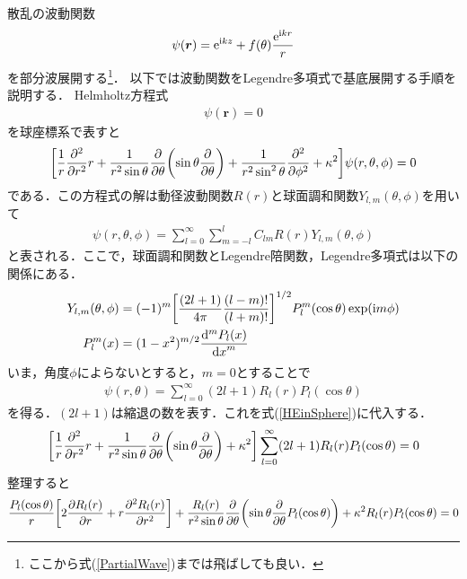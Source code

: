 \documentclass{report}
\begin{document}
  散乱の波動関数
  \begin{align}
    \psi(\bm{r}) = \mathrm{e}^{\mathrm{i} kz} + f(\theta)\frac{\mathrm{e}^{\mathrm{i} kr}}{r}
  \end{align}
  を部分波展開する\footnote{ここから式(\ref{PartialWave})までは飛ばしても良い．}．
  以下では波動関数をLegendre多項式で基底展開する手順を説明する．
  Helmholtz方程式
  \begin{align}
    [\nabla^2 + \kappa^2]\psi(\bm{r}) = 0
  \end{align}
  を球座標系で表すと
  \begin{align}
    \label{HEinSphere}
    \qty[\frac{1}{r}\frac{\partial^2}{\partial r^2}r + \frac{1}{r^2 \sin \theta} \frac{\partial}{\partial \theta}\qty(\sin\theta\frac{\partial}{\partial \theta})
    + \frac{1}{r^2 \sin^2\theta}\frac{\partial^2}{\partial \phi^2} + \kappa^2]\psi(r,\theta,\phi) = 0
  \end{align}
  である．この方程式の解は動径波動関数$R(r)$と球面調和関数$Y_{l,m}(\theta, \phi)$を用いて
  \begin{align}
    \psi(r,\theta,\phi) = \sum_{l=0}^{\infty}\sum_{m=-l}^{l}C_{lm}R(r)Y_{l,m}(\theta,\phi)
  \end{align}
  と表される．ここで，球面調和関数とLegendre陪関数，Legendre多項式は以下の関係にある．
  \begin{align}
    Y_{l,m}(\theta,\phi) &= (-1)^m \qty[\frac{(2l+1)}{4\pi}\frac{(l-m)!}{(l+m)!}]^{1/2}P_l^m(\cos\theta)\exp(\mathrm{i} m\phi)\\
    P_l^m(x) &= (1-x^2)^{m/2} \frac{\mathrm{d}^m P_l(x)}{\dd{x}^m}
  \end{align}
  いま，角度$\phi$によらないとすると，$m=0$とすることで
  \begin{align}
    \psi(r,\theta) = \sum_{l=0}^{\infty} (2l+1)R_l(r)P_l(\cos\theta)
  \end{align}
  を得る．$(2l+1)$は縮退の数を表す．これを式(\ref{HEinSphere})に代入する．
  \begin{align}
    \qty[\frac{1}{r}\frac{\partial^2}{\partial r^2}r + \frac{1}{r^2 \sin \theta} \frac{\partial}{\partial \theta}\qty(\sin\theta\frac{\partial}{\partial \theta})
    + \kappa^2] \sum_{l=0}^{\infty} (2l+1)R_l(r)P_l(\cos\theta)= 0
  \end{align}
  整理すると
  \begin{align}
    \label{Helmholtz separated}
    \frac{P_l(\cos\theta)}{r}\qty[2\frac{\partial R_l(r)}{\partial r} + r \frac{\partial^2 R_l(r)}{\partial r^2}]
    + \frac{R_l(r)}{r^2 \sin \theta} \frac{\partial}{\partial \theta}\qty(\sin\theta\frac{\partial}{\partial\theta}P_l(\cos\theta)) + \kappa^2 R_l(r)P_l(\cos\theta) = 0
  \end{align}
\end{document}
